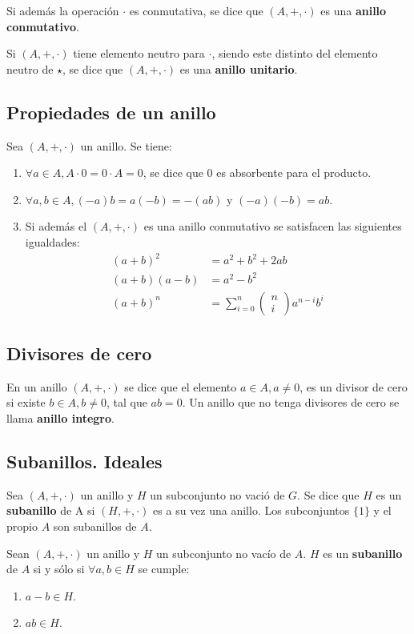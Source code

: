 Si además la operación $\cdot$ es conmutativa, se dice que $(A,+,\cdot)$ es una \textbf{anillo conmutativo}.

Si $(A,+,\cdot)$  tiene elemento neutro para $\cdot$, siendo este distinto del elemento neutro de $\star$, se dice que $(A,+,\cdot)$  es una \textbf{anillo unitario}.

\subsection{Propiedades de un anillo}

Sea $(A,+,\cdot)$ un anillo. Se tiene:
\begin{enumerate}
\item $\forall a \in A, A \cdot 0 = 0 \cdot A = 0$, se dice que $0$ es absorbente para el producto.
\item $\forall a,b \in A, (-a)b=a(-b)=-(ab)$ y $(-a)(-b)=ab$.
\item Si además el $(A,+,\cdot)$ es una anillo conmutativo se satisfacen las siguientes igualdades:
\begin{align*}
{(a+b)}^2&=a^2+b^2+2ab \\
(a+b)(a-b) &= a^2-b^2 \\
{(a+b)}^n&=\sum_{i=0}^n \begin{pmatrix}
n \\ i
\end{pmatrix} a^{n-i}b^i
\end{align*}
\end{enumerate}

\subsection{Divisores de cero}

En un anillo $(A,+,\cdot)$ se dice que el elemento $a \in A, a \neq 0$, es un divisor de cero si existe $b \in A, b \neq 0$, tal que $ab=0$. Un anillo que no tenga divisores de cero se llama \textbf{anillo integro}.

\subsection{Subanillos. Ideales}

Sea $(A,+,\cdot)$ un anillo y $H$ un subconjunto no vació de $G$. Se dice que $H$ es un \textbf{subanillo} de A si $(H,+,\cdot)$ es a su vez una anillo. Los subconjuntos $\{1\}$ y el propio $A$ son subanillos de $A$.

Sean $(A,+,\cdot)$ un anillo y $H$ un subconjunto no vacío de $A$. $H$ es un \textbf{subanillo} de $A$ si y sólo si $\forall a,b \in H$ se cumple:
\begin{enumerate}
\item $a-b \in H$.
\item $ab \in H$.
\end{enumerate}

